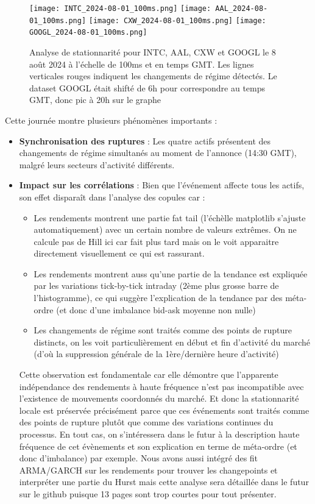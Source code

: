 \documentclass[10pt,a4paper]{article}
\theoremstyle{definition}
\theoremstyle{remark}
\begin{document}
\begin{figure}[h!]
\centering
        \texttt{[image: INTC\_2024-08-01\_100ms.png]}
        \texttt{[image: AAL\_2024-08-01\_100ms.png]}
        \texttt{[image: CXW\_2024-08-01\_100ms.png]}
        \texttt{[image: GOOGL\_2024-08-01\_100ms.png]}
    \caption{Analyse de stationnarité pour INTC, AAL, CXW et GOOGL le 8 août 2024 à l'échelle de 100ms et en temps GMT. Les lignes verticales rouges indiquent les changements de régime détectés.
    Le dataset GOOGL était shifté de 6h pour correspondre au temps GMT, donc pic à 20h sur le graphe}
    \label{fig:stationarity_unemployment}
\end{figure}

Cette journée montre plusieurs phénomènes importants :

\begin{itemize}
    \item \textbf{Synchronisation des ruptures} : Les quatre actifs présentent des changements de régime simultanés au moment de l'annonce (14:30 GMT), malgré leurs secteurs d'activité différents.

    \item \textbf{Impact sur les corrélations} : Bien que l'événement affecte tous les actifs, son effet disparaît dans l'analyse des copules car :
\begin{itemize}
        \item Les rendements montrent une partie fat tail (l'échèlle matplotlib s'ajuste automatiquement) avec un certain nombre de valeurs extrêmes. On ne calcule pas de Hill ici car fait plus tard mais on le voit apparaitre directement visuellement ce qui est rassurant.
        \item Les rendements montrent auss qu'une partie de la tendance est expliquée par les variations tick-by-tick intraday (2ème plus grosse barre de l'histogramme), ce qui suggère l'explication de la tendance par des méta-ordre (et donc d'une imbalance bid-ask moyenne non nulle)
        \item Les changements de régime sont traités comme des points de rupture distincts, on les voit particulièrement en début et fin d'activité  du marché (d'où la suppression générale de la 1ère/dernière heure d'activité)
\end{itemize}


Cette observation est fondamentale car elle démontre que l'apparente indépendance des rendements à haute fréquence n'est pas incompatible avec l'existence de mouvements coordonnés du marché. 
Et donc la stationnarité locale est préservée précisément parce que ces événements sont traités comme des points de rupture plutôt que comme des variations continues du processus.
En tout cas, on s'intéressera dans le futur à la description haute fréquence de cet évènements et son explication en terme de méta-ordre (et donc d'imbalance) par exemple. 
Nous avons aussi intégré des fit ARMA/GARCH sur les rendements pour trouver les changepoints et interpréter une partie du Hurst mais cette analyse sera détaillée dans le futur sur le github puisque 13 pages sont trop courtes pour tout présenter.


\end{itemize}
\end{document}
